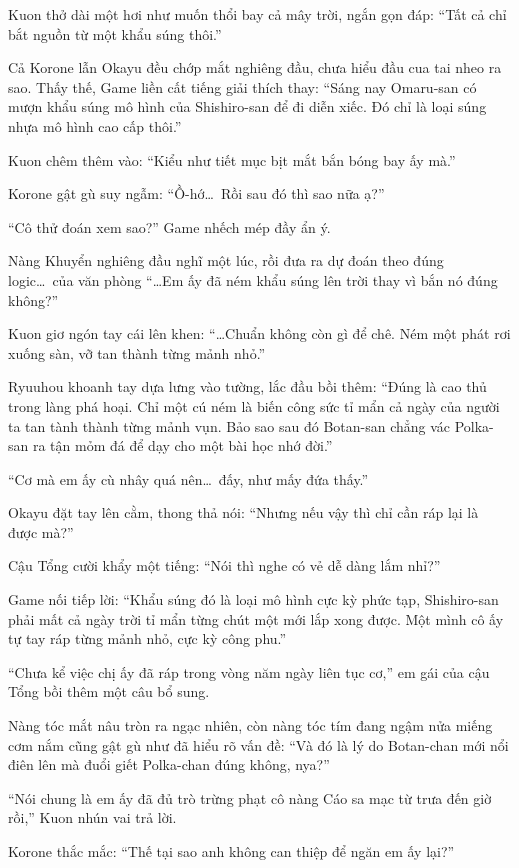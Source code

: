 \documentclass[../main.tex]{subfiles}
\begin{document}
Kuon thở dài một hơi như muốn thổi bay cả mây trời, ngắn gọn đáp: ``Tất cả chỉ bắt nguồn từ một khẩu súng thôi.''

Cả Korone lẫn Okayu đều chớp mắt nghiêng đầu, chưa hiểu đầu cua tai nheo ra sao. Thấy thế, Game liền cất tiếng giải thích thay: ``Sáng nay Omaru-san có mượn khẩu súng mô hình của Shishiro-san để đi diễn xiếc. Đó chỉ là loại súng nhựa mô hình cao cấp thôi.''

Kuon chêm thêm vào: ``Kiểu như tiết mục bịt mắt bắn bóng bay ấy mà.''

Korone gật gù suy ngẫm: ``Ồ-hớ\dots\ Rồi sau đó thì sao nữa ạ?''

``Cô thử đoán xem sao?'' Game nhếch mép đầy ẩn ý.

Nàng Khuyển nghiêng đầu nghĩ một lúc, rồi đưa ra dự đoán theo đúng logic\dots\ của văn phòng \hll\: ``\dots Em ấy đã ném khẩu súng lên trời thay vì bắn nó đúng không?''

Kuon giơ ngón tay cái lên khen: ``\dots Chuẩn không còn gì để chê. Ném một phát rơi xuống sàn, vỡ tan thành từng mảnh nhỏ.''

Ryuuhou khoanh tay dựa lưng vào tường, lắc đầu bồi thêm: ``Đúng là cao thủ trong làng phá hoại. Chỉ một cú ném là biến công sức tỉ mẩn cả ngày của người ta tan tành thành từng mảnh vụn. Bảo sao sau đó Botan-san chẳng vác Polka-san ra tận mỏm đá để dạy cho một bài học nhớ đời.''

``Cơ mà em ấy cù nhây quá nên\dots\ đấy, như mấy đứa thấy.''

Okayu đặt tay lên cằm, thong thả nói: ``Nhưng nếu vậy thì chỉ cần ráp lại là được mà?''

Cậu Tổng cười khẩy một tiếng: ``Nói thì nghe có vẻ dễ dàng lắm nhỉ?''

Game nối tiếp lời: ``Khẩu súng đó là loại mô hình cực kỳ phức tạp, Shishiro-san phải mất cả ngày trời tỉ mẩn từng chút một mới lắp xong được. Một mình cô ấy tự tay ráp từng mảnh nhỏ, cực kỳ công phu.''

``Chưa kể việc chị ấy đã ráp trong vòng năm ngày liên tục cơ,'' em gái của cậu Tổng bồi thêm một câu bổ sung.

Nàng tóc mắt nâu tròn ra ngạc nhiên, còn nàng tóc tím đang ngậm nửa miếng cơm nắm cũng gật gù như đã hiểu rõ vấn đề: ``Và đó là lý do Botan-chan mới nổi điên lên mà đuổi giết Polka-chan đúng không, nya?''

``Nói chung là em ấy đã đủ trò trừng phạt cô nàng Cáo sa mạc từ trưa đến giờ rồi,'' Kuon nhún vai trả lời.

Korone thắc mắc: ``Thế tại sao anh không can thiệp để ngăn em ấy lại?''
\end{document}
